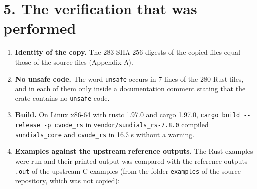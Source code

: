 \documentclass[
  10pt,
]{article}
\providecommand{\tightlist}{%
  \setlength{\itemsep}{0pt}\setlength{\parskip}{0pt}}
\begin{document}
\hypertarget{the-verification-that-was-performed}{%
\section{5. The verification that was
performed}\label{the-verification-that-was-performed}}

\begin{enumerate}
\def\labelenumi{\arabic{enumi}.}
\tightlist
\item
  \textbf{Identity of the copy.} The 283 SHA-256 digests of the copied
  files equal those of the source files (Appendix A).
\item
  \textbf{No unsafe code.} The word \texttt{unsafe} occurs in 7 lines of
  the 280 Rust files, and in each of them only inside a documentation
  comment stating that the crate contains no \texttt{unsafe} code.
\item
  \textbf{Build.} On Linux x86-64 with rustc 1.97.0 and cargo 1.97.0,
  \texttt{cargo\ build\ -\/-release\ -p\ cvode\_rs} in
  \texttt{vendor/sundials\_rs-7.8.0} compiled \texttt{sundials\_core}
  and \texttt{cvode\_rs} in 16.3 s without a warning.
\item
  \textbf{Examples against the upstream reference outputs.} The Rust
  examples were run and their printed output was compared with the
  reference outputs \texttt{.out} of the upstream C examples (from the
  folder \texttt{examples} of the source repository, which was not
  copied):
\end{enumerate}
\end{document}
